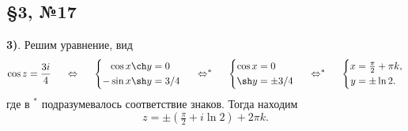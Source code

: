 \subsection*{\S3, №17}


\textbf{3)}. Решим уравнение, вид
\begin{equation*}
    \cos z = \frac{3i}{4}
    \hspace{5 mm} \Leftrightarrow \hspace{5 mm} 
    \left\{\begin{aligned}
        \cos x \ch y &= 0 \\
        -\sin x \sh y &= 3/4 
    \end{aligned}\right.
    \hspace{5 mm} \Leftrightarrow^* \hspace{5 mm} 
    \left\{\begin{aligned}
        \cos x &= 0 \\
        \sh y &= \pm 3/4 
    \end{aligned}\right.
    \hspace{5 mm} \Leftrightarrow^* \hspace{5 mm} 
    \left\{\begin{aligned}
        x &= \tfrac{\pi}{2} + \pi k, \\
        y &= \pm \ln 2.
    \end{aligned}\right.
\end{equation*}
где в $^*$ подразумевалось соответствие знаков. Тогда находим
\begin{equation*}
    z = \pm \left(\tfrac{\pi}{2} + i \ln 2\right) + 2 \pi k.
\end{equation*}

